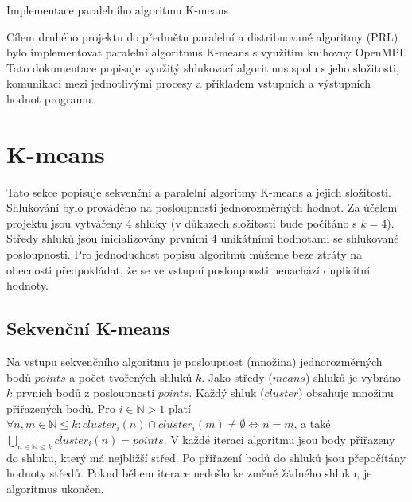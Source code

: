 \documentclass[a4paper, 11pt, fleqn]{scrartcl}
\newcommand{\NAZEV}{Implementace paralelního algoritmu K-means}
\begin{document}
  \begin{center}
    {\Large \NAZEV}
  \end{center}

  Cílem druhého projektu do předmětu paralelní a distribuované algoritmy (PRL) bylo implementovat paralelní algoritmus K-means s využitím knihovny OpenMPI. Tato dokumentace popisuje využitý shlukovací algoritmus spolu s jeho složitosti, komunikaci mezi jednotlivými procesy a příkladem vstupních a výstupních hodnot programu.

  \section{K-means}
    Tato sekce popisuje sekvenční a paralelní algoritmy K-means a jejich složitosti. Shlukování bylo prováděno na posloupnosti jednorozměrných hodnot. Za účelem projektu jsou vytvářeny 4 shluky (v důkazech složitosti bude počítáno s $k = 4$). Středy shluků jsou inicializovány prvními 4 unikátními hodnotami se shlukované posloupnosti. Pro jednoduchost popisu algoritmů můžeme beze ztráty na obecnosti předpokládat, že se ve vstupní posloupnosti nenachází duplicitní hodnoty.

    \subsection{Sekvenční K-means}

      Na vstupu sekvenčního algoritmu je posloupnost (množina) jednorozměrných bodů $points$ a počet tvořených shluků $k$. Jako středy ($means$) shluků je vybráno $k$ prvních bodů z posloupnosti $points$. Každý shluk ($cluster$) obsahuje množinu přiřazených bodů. Pro $i \in \mathbb{N} > 1$ platí $\forall n, m \in \mathbb{N} \leq k: cluster_i(n) \cap cluster_i(m) \neq \emptyset \iff n = m$, a také $\bigcup_{n \in \mathbb{N} \leq k} cluster_i(n) = points$. V každé iteraci algoritmu jsou body přiřazeny do shluku, který má nejbližší střed. Po přiřazení bodů do shluků jsou přepočítány hodnoty středů. Pokud během iterace nedošlo ke změně žádného shluku, je algoritmus ukončen.
\end{document}
